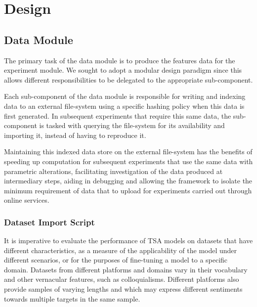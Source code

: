 \documentclass[12pt, a4paper]{report}
\theoremstyle{definition}
\theoremstyle{definition}%
\theoremstyle{definition}%
\theoremstyle{definition}%
\theoremstyle{definition}%
\theoremstyle{definition}%
\begin{document}
\chapter{Design}



\section{Data Module}
The primary task of the data module is to produce the features data for the experiment module. We sought to adopt a modular design paradigm since this allows different responsibilities to be delegated to the appropriate sub-component.

Each sub-component of the data module is responsible for writing and indexing data to an external file-system using a specific hashing policy when this data is first generated. In subsequent experiments that require this same data, the sub-component is tasked with querying the file-system for its availability and importing it, instead of having to reproduce it.

Maintaining this indexed data store on the external file-system has the benefits of speeding up computation for subsequent experiments that use the same data with parametric alterations, facilitating investigation of the data produced at intermediary steps, aiding in debugging and allowing the framework to isolate the minimum requirement of data that to upload for experiments carried out through online services.

\subsection{Dataset Import Script}
It is imperative to evaluate the performance of TSA models on datasets that have different characteristics, as a measure of the applicability of the model under different scenarios, or for the purposes of fine-tuning a model to a specific domain. Datasets from different platforms and domains vary in their vocabulary and other vernacular features, such as colloquialisms. Different platforms also provide samples of varying lengths and which may express different sentiments towards multiple targets in the same sample.
\end{document}
